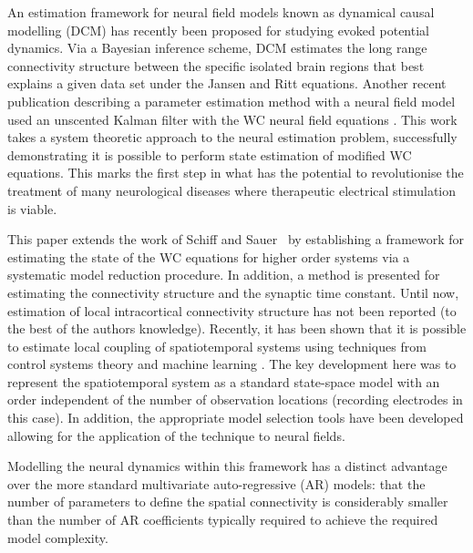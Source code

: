\documentclass[12pt]{iopart}
\begin{document}
An estimation framework for neural field models known as dynamical causal modelling (DCM) \cite{David2003,David2006} has recently been proposed for studying evoked potential dynamics. Via a Bayesian inference scheme, DCM estimates the long range connectivity structure between the specific isolated brain regions that best explains a given data set under the Jansen and Ritt equations. Another recent publication describing a parameter estimation method with a neural field model used an unscented Kalman filter with the WC neural field equations \cite{schiff2008kalman}. This work takes a system theoretic approach to the neural estimation problem, successfully demonstrating it is possible to perform state estimation of modified WC equations. This marks the first step in what has the potential to revolutionise the treatment of many neurological diseases where therapeutic electrical stimulation is viable.


This paper extends the work of Schiff and Sauer~\cite{schiff2008kalman} by establishing a framework for estimating the state of the WC equations for higher order systems via a systematic model reduction procedure. In addition, a method is presented for estimating the connectivity structure and the synaptic time constant. Until now, estimation of local intracortical connectivity structure has not been reported (to the best of the authors knowledge). Recently, it has been shown that it is possible to estimate local coupling of spatiotemporal systems using techniques from control systems theory and machine learning \cite{Dewar2009}. The key development here was to represent the spatiotemporal system as a standard state-space model with an order independent of the number of observation locations (recording electrodes in this case). In addition, the appropriate model selection tools have been developed \cite{Scerri2009} allowing for the application of the technique to neural fields. 

Modelling the neural dynamics within this framework has a distinct advantage over the more standard multivariate auto-regressive (AR) models: that the number of parameters to define the spatial connectivity is considerably smaller than the number of AR coefficients typically required to achieve the required model complexity. 
\end{document}

